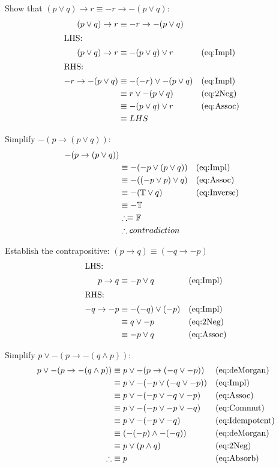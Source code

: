 Show that $(p \lor q) \to r \equiv -r \to -(p \lor q)$:
\begin{align}
  (p \lor q) \to r & \equiv -r \to -(p \lor q) \\
  \intertext{LHS:}
  (p \lor q) \to r & \equiv - (p \lor q) \lor r      && \text{(eq:Impl)}\\
  \intertext{RHS:}
  -r \to -(p \lor q) & \equiv -(-r) \lor -(p \lor q) && \text{(eq:Impl)}\\
    & \equiv r \lor -(p \lor q)                      && \text{(eq:2Neg)}\\
    & \equiv -(p \lor q) \lor r                      && \text{(eq:Assoc)}\\
    & \equiv LHS  
\end{align}

Simplify $ -(p \to (p \lor q)) $:
\begin{align}
  -(p \to (p \lor q)) & \\
  & \equiv -(-p \lor (p \lor q))   && \text{(eq:Impl)}\\
  & \equiv -((-p \lor p) \lor q)   && \text{(eq:Assoc)}\\
  & \equiv -(\mathbb{T} \lor q)    && \text{(eq:Inverse)}\\
  & \equiv -\mathbb{T} && \\
  & \therefore \equiv \mathbb{F} && \\
  & \therefore contradiction
\end{align}

Establish the contrapositive: $ (p \to q ) \equiv (-q \to -p)$
\begin{align}
  \intertext{LHS:}
  p \to q & \equiv -p \lor q         && \text{(eq:Impl)}\\
  \intertext{RHS:}
  -q \to -p & \equiv -(-q) \lor (-p) && \text{(eq:Impl)}\\
            & \equiv q \lor -p       && \text{(eq:2Neg)}\\
            & \equiv -p \lor q       && \text{(eq:Assoc)}
\end{align}

Simplify $p \lor -(p \to -(q \land p))$:
\begin{align}
  p \lor -(p \to -(q \land p)) & \equiv p \lor -(p \to (-q \lor -p))
                                          && \text{(eq:deMorgan)}\\
  & \equiv p \lor -(-p \lor (-q \lor -p)) && \text{(eq:Impl)}\\
  & \equiv p \lor -(-p \lor -q \lor -p )  && \text{(eq:Assoc)}\\
  & \equiv p \lor -(-p \lor -p \lor -q)   && \text{(eq:Commut)}\\
  & \equiv p \lor -(-p \lor -q)           && \text{(eq:Idempotent)}\\
  & \equiv (-(-p) \land -(-q))            && \text{(eq:deMorgan)}\\
  & \equiv p \lor (p \land q)             && \text{(eq:2Neg)}\\
  \therefore & \equiv p                   && \text{(eq:Absorb)}
\end{align}

